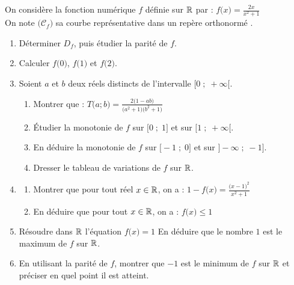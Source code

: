 \documentclass[10pt, a4paper]{article}
\begin{document}
\begin{Exercice}[][45 min]
On considère la fonction numérique $f$ définie sur $\mathbb{R}$ par : \quad
$f\big(x\big) = \frac{2x}{x^2 + 1}$
\vspace{0.2cm} \\
On note $\big(\mathcal{C}_f\big)$ sa courbe représentative dans un repère orthonormé \Oij.

\begin{enumerate}[leftmargin=*,itemsep=1pt]
    \item Déterminer $D_f$, puis étudier la parité de $f$.
    \item Calculer $f\big(0\big)$, $f\big(1\big)$ et $f\big(2\big)$.

    \item Soient $a$ et $b$ deux réels distincts de l'intervalle $\big[0 \;;\; +\infty\big[$.
    \begin{enumerate}[leftmargin=*,itemsep=1pt]
        \item Montrer que :
        $T\big(a; b\big) = \frac{2\big(1 - ab\big)}{\big(a^2 + 1\big)\big(b^2 + 1\big)}$
        \item Étudier la monotonie de $f$ sur $\big[0 \;;\; 1\big]$ et sur $\big[1 \;;\; +\infty\big[$.
        \item En déduire la monotonie de $f$ sur $\big[-1 \;;\; 0\big]$ et sur $\big]-\infty \;;\; -1\big]$.
        \item Dresser le tableau de variations de $f$ sur $\mathbb{R}$.
    \end{enumerate}

    \item
    \begin{enumerate}[leftmargin=*,itemsep=1pt]
        \item Montrer que pour tout réel $x \in \mathbb{R}$, on a : $1 - f\big(x\big) = \frac{\big(x - 1\big)^2}{x^2 + 1}$
        \item En déduire que pour tout $x \in \mathbb{R}$, on a : $f\big(x\big) \leqslant 1$
    \end{enumerate}
    \item Résoudre dans $\mathbb{R}$ l'équation $f\big(x\big) = 1$
          En déduire que le nombre $1$ est le maximum de $f$ sur $\mathbb{R}$.
    \item En utilisant la parité de $f$, montrer que $-1$ est le minimum de $f$ sur $\mathbb{R}$ et préciser en quel point il est atteint.
\end{enumerate}
\end{Exercice}
\end{document}
